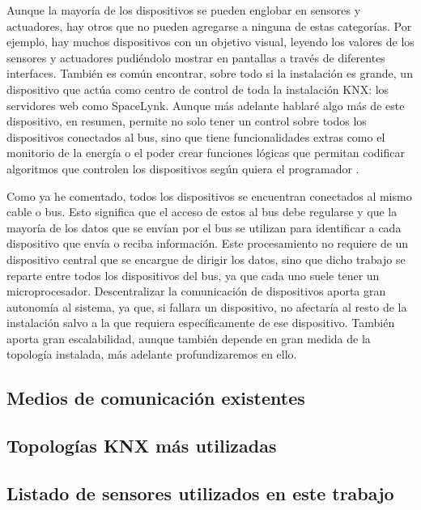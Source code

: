 Aunque la mayoría de los dispositivos se pueden englobar en sensores y actuadores, hay otros que no pueden agregarse a ninguna de estas categorías. Por ejemplo, hay muchos dispositivos con un objetivo visual, leyendo los valores de los sensores y actuadores pudiéndolo mostrar en pantallas a través de diferentes interfaces. También es común encontrar, sobre todo si la instalación es grande, un dispositivo que actúa como centro de control de toda la instalación KNX: los servidores web como SpaceLynk. Aunque más adelante hablaré algo más de este dispositivo, en resumen, permite no solo tener un control sobre todos los dispositivos conectados al bus, sino que tiene funcionalidades extras como el monitorio de la energía o el poder crear funciones lógicas que permitan codificar algoritmos que controlen los dispositivos según quiera el programador \cite{intro_6}.

Como ya he comentado, todos los dispositivos se encuentran conectados al mismo cable o bus. Esto significa que el acceso de estos al bus debe regularse y que la mayoría de los datos que se envían por el bus se utilizan para identificar a cada dispositivo que envía o reciba información. 
Este procesamiento no requiere de un dispositivo central que se encargue de dirigir los datos, sino que dicho trabajo se reparte entre todos los dispositivos del bus, ya que cada uno suele tener un microprocesador. Descentralizar la comunicación de dispositivos aporta gran autonomía al sistema, ya que, si fallara un dispositivo, no afectaría al resto de la instalación salvo a la que requiera específicamente de ese dispositivo. También aporta gran escalabilidad, aunque también depende en gran medida de la topología instalada, más adelante profundizaremos en ello.

\subsection{Medios de comunicación existentes}

\subsection{Topologías KNX más utilizadas}

\subsection{Listado de sensores utilizados en este trabajo}


